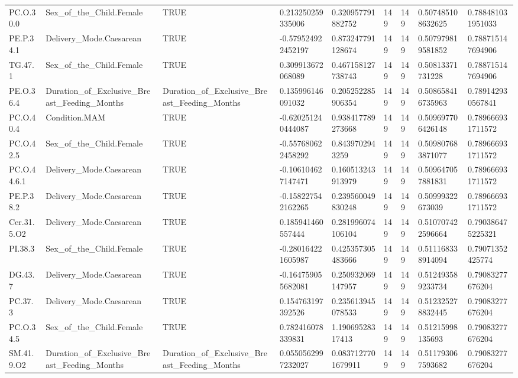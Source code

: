 \begin{longtable}{lllllllll}
PC.O.30.0 & Sex\_of\_the\_Child.Female & TRUE & 0.213250259335006 & 0.320957791882752 & 149 & 149 & 0.507485108632625 & 0.788481031951033 \\
PE.P.34.1 & Delivery\_Mode.Caesarean & TRUE & -0.579524922452197 & 0.873247791128674 & 149 & 149 & 0.507979819581852 & 0.788715147694906 \\
TG.47.1 & Sex\_of\_the\_Child.Female & TRUE & 0.309913672068089 & 0.467158127738743 & 149 & 149 & 0.50813371731228 & 0.788715147694906 \\
PE.O.36.4 & Duration\_of\_Exclusive\_Breast\_Feeding\_Months & Duration\_of\_Exclusive\_Breast\_Feeding\_Months & 0.135996146091032 & 0.205252285906354 & 149 & 149 & 0.508658416735963 & 0.789142930567841 \\
PC.O.40.4 & Condition.MAM & TRUE & -0.620251240444087 & 0.938417789273668 & 149 & 149 & 0.509697706426148 & 0.789666931711572 \\
PC.O.42.5 & Sex\_of\_the\_Child.Female & TRUE & -0.557680622458292 & 0.8439702943259 & 149 & 149 & 0.509807683871077 & 0.789666931711572 \\
PC.O.44.6.1 & Delivery\_Mode.Caesarean & TRUE & -0.106104627147471 & 0.160513243913979 & 149 & 149 & 0.509647057881831 & 0.789666931711572 \\
PE.P.38.2 & Delivery\_Mode.Caesarean & TRUE & -0.158227542162265 & 0.239560049830248 & 149 & 149 & 0.50999322673039 & 0.789666931711572 \\
Cer.31.5.O2 & Delivery\_Mode.Caesarean & TRUE & 0.185941460557444 & 0.281996074106104 & 149 & 149 & 0.510707422596664 & 0.790386475225321 \\
PI.38.3 & Sex\_of\_the\_Child.Female & TRUE & -0.280164221605987 & 0.425357305483666 & 149 & 149 & 0.511168338914094 & 0.79071352425774 \\
DG.43.7 & Delivery\_Mode.Caesarean & TRUE & -0.164759055682081 & 0.250932069147957 & 149 & 149 & 0.512493589233734 & 0.79083277676204 \\
PC.37.3 & Delivery\_Mode.Caesarean & TRUE & 0.154763197392526 & 0.235613945078533 & 149 & 149 & 0.512325278832445 & 0.79083277676204 \\
PC.O.34.5 & Sex\_of\_the\_Child.Female & TRUE & 0.782416078339831 & 1.19069528317413 & 149 & 149 & 0.51215998135693 & 0.79083277676204 \\
SM.41.9.O2 & Duration\_of\_Exclusive\_Breast\_Feeding\_Months & Duration\_of\_Exclusive\_Breast\_Feeding\_Months & 0.0550562997232027 & 0.0837127701679911 & 149 & 149 & 0.511793067593682 & 0.79083277676204 \\

\end{longtable}
